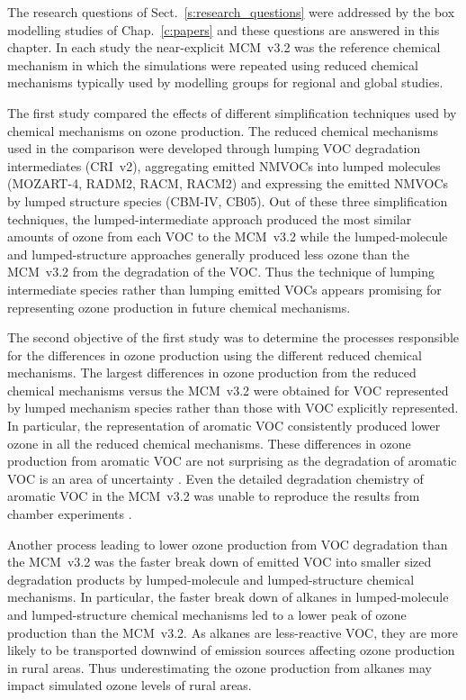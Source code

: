 The research questions of Sect.~\ref{s:research_questions} were addressed by the box modelling studies of Chap.~\ref{c:papers} and these questions are answered in this chapter.
In each study the near-explicit MCM~v3.2 was the reference chemical mechanism in which the simulations were repeated using reduced chemical mechanisms typically used by modelling groups for regional and global studies.

The first study compared the effects of different simplification techniques used by chemical mechanisms on ozone production.
The reduced chemical mechanisms used in the comparison were developed through lumping VOC degradation intermediates (CRI~v2), aggregating emitted NMVOCs into lumped molecules (MOZART-4, RADM2, RACM, RACM2) and expressing the emitted NMVOCs by lumped structure species (CBM-IV, CB05).
Out of these three simplification techniques, the lumped-intermediate approach produced the most similar amounts of ozone from each VOC to the MCM~v3.2 while the lumped-molecule and lumped-structure approaches generally produced less ozone than the MCM~v3.2 from the degradation of the VOC.
Thus the technique of lumping intermediate species rather than lumping emitted VOCs appears promising for representing ozone production in future chemical mechanisms.

The second objective of the first study was to determine the processes responsible for the differences in ozone production using the different reduced chemical mechanisms.
The largest differences in ozone production from the reduced chemical mechanisms versus the MCM~v3.2 were obtained for VOC represented by lumped mechanism species rather than those with VOC explicitly represented.
In particular, the representation of aromatic VOC consistently produced lower ozone in all the reduced chemical mechanisms.
These differences in ozone production from aromatic VOC are not surprising as the degradation of aromatic VOC is an area of uncertainty \citep{Atkinson:2003}.
Even the detailed degradation chemistry of aromatic VOC in the MCM~v3.2 was unable to reproduce the results from chamber experiments \citep{Bloss:2005}.

Another process leading to lower ozone production from VOC degradation than the MCM~v3.2 was the faster break down of emitted VOC into smaller sized degradation products by lumped-molecule and lumped-structure chemical mechanisms.
In particular, the faster break down of alkanes in lumped-molecule and lumped-structure chemical mechanisms led to a lower peak of ozone production than the MCM~v3.2.
As alkanes are less-reactive VOC, they are more likely to be transported downwind of emission sources affecting ozone production in rural areas.
Thus underestimating the ozone production from alkanes may impact simulated ozone levels of rural areas.

